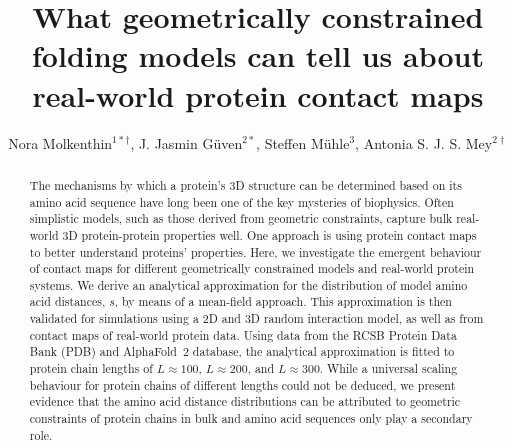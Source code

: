 \documentclass[10pt]{iopart}
\begin{document}
\title[Geometrically constrained folding models]{What geometrically constrained folding models can tell us about real-world protein contact maps}
\author{Nora Molkenthin$^{1*\dagger}$, J. Jasmin Güven$^{2*}$, Steffen Mühle$^{3}$, Antonia S. J. S. Mey$^{2\dagger}$}
\address{$^1$Potsdam Institute for Climate Impact Research, Germany}
\address{$^2$EaStCHEM School of Chemistry, University of Edinburgh, Edinburgh, United Kingdom}
\address{$^3$Max-Planck Institute for Dynamics and Self-Organization (MPIDS), Am Faßberg 17, 37077 Göttingen, Germany}
\address{$^*$ These authors contributed equally}
\address{$^\dagger$ To whom correspondence should be addressed}


\begin{abstract}
The mechanisms by which a protein's 3D structure can be determined based on its amino acid sequence have long been one of the key mysteries of biophysics. Often simplistic models, such as those derived from geometric constraints, capture bulk real-world 3D protein-protein properties well. One approach is using protein contact maps to better understand proteins' properties. Here, we investigate the emergent behaviour of contact maps for different geometrically constrained models and real-world protein systems. We derive an analytical approximation for the distribution of model amino acid distances, $s$, by means of a mean-field approach. This approximation is then validated for simulations using a 2D and 3D random interaction model, as well as from contact maps of real-world protein data. Using data from the RCSB Protein Data Bank (PDB) and AlphaFold~2 database, the analytical approximation is fitted to protein chain lengths of $L\approx100$, $L\approx200$, and $L\approx300$. While a universal scaling behaviour for protein chains of different lengths could not be deduced, we present evidence that the amino acid distance distributions can be attributed to geometric constraints of protein chains in bulk and amino acid sequences only play a secondary role. 

\end{abstract}
\maketitle
\end{document}
